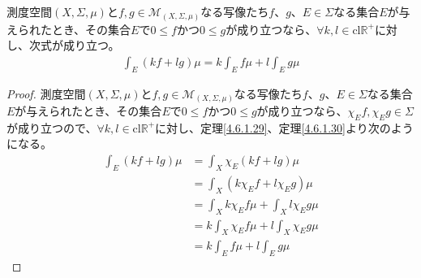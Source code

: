 \documentclass[dvipdfmx]{jsarticle}
\begin{document}
\begin{thm}\label{4.6.1.31}
測度空間$(X,\varSigma,\mu)$と$f,g \in \mathcal{M}_{(X,\varSigma,\mu)}$なる写像たち$f$、$g$、$E \in \varSigma$なる集合$E$が与えられたとき、その集合$E$で$0 \leq f$かつ$0 \leq g$が成り立つなら、$\forall k,l \in \mathrm{cl}\mathbb{R}^{+}$に対し、次式が成り立つ。
\begin{align*}
\int_{E} {(kf + lg)\mu} = k\int_{E} {f\mu} + l\int_{E} {g\mu}
\end{align*}
\end{thm}
\begin{proof}
測度空間$(X,\varSigma,\mu)$と$f,g \in \mathcal{M}_{(X,\varSigma,\mu)}$なる写像たち$f$、$g$、$E \in \varSigma$なる集合$E$が与えられたとき、その集合$E$で$0 \leq f$かつ$0 \leq g$が成り立つなら、$\chi_{E}f,\chi_{E}g \in \varSigma$が成り立つので、$\forall k,l \in \mathrm{cl}\mathbb{R}^{+}$に対し、定理\ref{4.6.1.29}、定理\ref{4.6.1.30}より次のようになる。
\begin{align*}
\int_{E} {(kf + lg)\mu} &= \int_{X} {\chi_{E}(kf + lg)\mu}\\
&= \int_{X} {\left( k\chi_{E}f + l\chi_{E}g \right)\mu}\\
&= \int_{X} {k\chi_{E}f\mu} + \int_{X} {l\chi_{E}g\mu}\\
&= k\int_{X} {\chi_{E}f\mu} + l\int_{X} {\chi_{E}g\mu}\\
&= k\int_{E} {f\mu} + l\int_{E} {g\mu}
\end{align*}
\end{proof}
\end{document}
